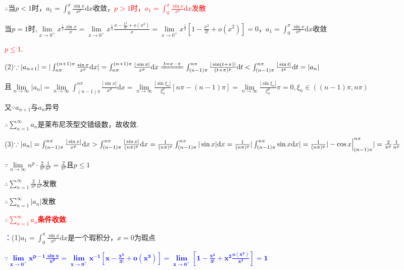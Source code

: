 \documentclass[12pt,UTF8]{ctexart}
\begin{document}
\begin{enumerate}
$\therefore$当$p<1$时，$a_1=\int_0^\pi\frac{\sin x}{x^p}\mathrm dx$收敛，\textcolor{red}{$p>1$时，$a_1=\int_0^\pi\frac{\sin x}{x^p}\mathrm dx$发散}

当$p=1$时,$\lim\limits_{x\rightarrow0^+}x^{\frac12}\frac{\sin x}x=\lim\limits_{x\rightarrow0^+}x^{\frac12}\frac{x-\frac{x^3}{3!}+o(x^3)}x=\lim\limits_{x\rightarrow0^+}x^{\frac12}[1-\frac{x^2}{3!}+o(x^2)]=0$，$a_1=\int_0^\pi\frac{\sin x}{x^p}\mathrm dx$收敛

\textcolor{red}{$p\leq1$}.

(2)$\because|a_{n+1}|=|\int_{n\pi}^{(n+1)\pi}\frac{\sin x}{x^p}\mathrm dx|=\int_{n\pi}^{(n+1)\pi}\frac{|\sin x|}{x^p}\mathrm dx\xlongequal{t=x-\pi}\int_{(n-1)\pi}^{n\pi}\frac{|\sin(t+\pi)|}{(t+\pi)^p}\mathrm dt\\
<\int_{(n-1)\pi}^{n\pi}\frac{|\sin t|}{t^p}\mathrm dt=|a_n|$

且$\lim\limits_{n\rightarrow\infty}|a_n|=\lim\limits_{n\rightarrow\infty}\int_{(n-1)\pi}^{n\pi}\frac{|\sin x|}{x^{p}}\mathrm dx=\lim\limits_{n\rightarrow\infty}\frac{|\sin\xi_n|}{\xi_n^p}[n\pi-(n-1)\pi]=\lim\limits_{n\rightarrow\infty}\frac{|\sin\xi_n|}{\xi_n^p}\pi=0,\xi_n\in((n-1)\pi,n\pi)$

又$\because a_{n+1}$与$a_n$异号

$\therefore\sum_{n=1}^\infty a_n$是莱布尼茨型交错级数，故收敛.

(3)$\because|a_n|=\int_{(n-1)\pi}^{n\pi}\frac{|\sin x|}{x^p}\mathrm dx>\int_{(n-1)\pi}^{n\pi}\frac{|\sin x|}{(n\pi)^p}\mathrm dx=\frac1{(n\pi)^p}\int_{(n-1)\pi}^{n\pi}|\sin x|\mathrm dx=\frac1{(n\pi)^p}|\int_{(n-1)\pi}^{n\pi}\sin x\mathrm dx|\\
=\frac1{(n\pi)^p}|-\cos x\Big|_{(n-1)\pi}^{n\pi}|=\frac2{\pi^p}\frac1{n^p}$

$\because\lim\limits_{n\rightarrow\infty}n^p\cdot\frac2{\pi^p}\frac1{n^p}=\frac2{\pi^p}$且$p\leq1$

$\therefore\sum_{n=1}^\infty\frac2{\pi^p}\frac1{n^p}$发散

$\therefore\sum_{n=1}^\infty|a_n|$发散

\textcolor{red}{\bf$\therefore\sum_{n=1}^\infty a_n$条件收敛}.

\textcolor{blue}{：}(1)$a_1=\int_0^\pi\frac{\sin x}{x^p}\mathrm dx$是一个瑕积分，$x=0$为瑕点

\textcolor{blue}{$\bm{\because\lim\limits_{x\rightarrow0^+}x^{p-1}\frac{\sin x}{x^p}=\lim\limits_{x\rightarrow0^+}x^{-1}[x-\frac{x^3}{3!}+o(x^3)]=\lim\limits_{x\rightarrow0^+}[1-\frac{x^2}{3!}+x^2\frac{o(x^2)}{x^2}]=1}$}


\end{enumerate}
\end{document}
